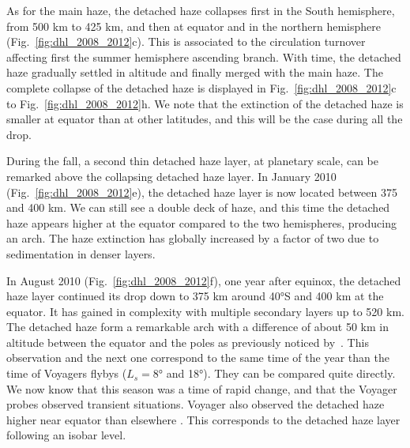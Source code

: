 As for the main haze, the detached haze collapses first in the South hemisphere, from 500 km to 425 km, and
then at equator and in the northern hemisphere (Fig.~\ref{fig:dhl_2008_2012}c).
This is associated to the circulation turnover affecting first the summer hemisphere ascending branch.
With time, the detached haze gradually settled in altitude and finally merged with
the main haze. The complete collapse of the detached haze is displayed in Fig.~\ref{fig:dhl_2008_2012}c to
Fig.~\ref{fig:dhl_2008_2012}h. We note that the extinction of the detached haze is smaller at equator than at
other latitudes, and this will be the case during all the drop.

During the fall, a second thin detached haze layer, at planetary scale, can be remarked above the collapsing detached
haze layer. In January 2010 (Fig.~\ref{fig:dhl_2008_2012}e), the detached haze layer is now located between 375 and 400 km.
We can still see a double deck of haze, and this time the detached haze appears higher at the equator compared to the two
hemispheres, producing an arch. The haze extinction has globally increased by a factor of two due to sedimentation
in denser layers.

In August 2010 (Fig.~\ref{fig:dhl_2008_2012}f), one year after equinox, the detached haze layer continued
its drop down to 375 km around \ang{40}S and 400 km at the equator. It has gained in complexity with
multiple secondary layers up to 520 km. The detached haze form a remarkable arch with a difference of about 50 km
in altitude between the equator and the poles as previously noticed by~\cite{West2011}.
This observation and the next one correspond to the same time of the
year than the time of Voyagers flybys ($L_s=\ang{8}$ and \ang{18}). They can be compared quite directly. We now know
that this season was a time of rapid change, and that the Voyager probes observed transient situations. Voyager also
observed the detached haze higher near equator than elsewhere \citep{Rages1983, Rannou2000}. This corresponds to
the detached haze layer following an isobar level.

